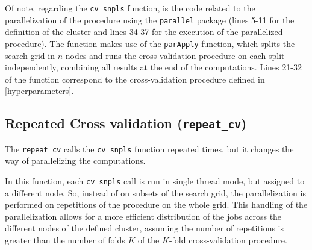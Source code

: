 Of note, regarding the \texttt{cv\_snpls} function, is the code related to the parallelization of the procedure using the \texttt{parallel} package (lines 5-11 for the definition of the cluster and lines 34-37 for the execution of the parallelized procedure). The function makes use of the \texttt{parApply} function, which splits the search grid in $n$ nodes and runs the cross-validation procedure on each split independently, combining all results at the end of the computations. Lines 21-32 of the function correspond to the cross-validation procedure defined in \autoref{hyperparameters}.

\subsection{Repeated Cross validation (\texttt{repeat\_cv})}
\label{repeatcv}
The \texttt{repeat\_cv} calls the \texttt{cv\_snpls} function repeated times, but it changes the way of parallelizing the computations. 

In this function, each \texttt{cv\_snpls} call is run in single thread mode, but assigned to a different node. So, instead of on subsets of the search grid, the parallelization is performed on repetitions of the procedure on the whole grid. This handling of the parallelization allows for a more efficient distribution of the jobs across the different nodes of the defined cluster, assuming the number of repetitions is greater than the number of folds $K$ of the $K$-fold cross-validation procedure.

